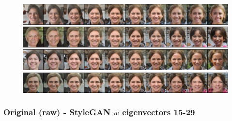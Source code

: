 \documentclass{article}
\begin{document}
\begin{figure}[H]
  \includegraphics[width=0.9\linewidth]{eigen/raw_gan_11.png}
  \includegraphics[width=0.9\linewidth]{eigen/raw_gan_12.png}
  \includegraphics[width=0.9\linewidth]{eigen/raw_gan_13.png}
  \includegraphics[width=0.9\linewidth]{eigen/raw_gan_14.png}
\end{figure}

\newpage
\subsubsection*{Original (raw) - StyleGAN $w$ eigenvectors 15-29}
\end{document}

